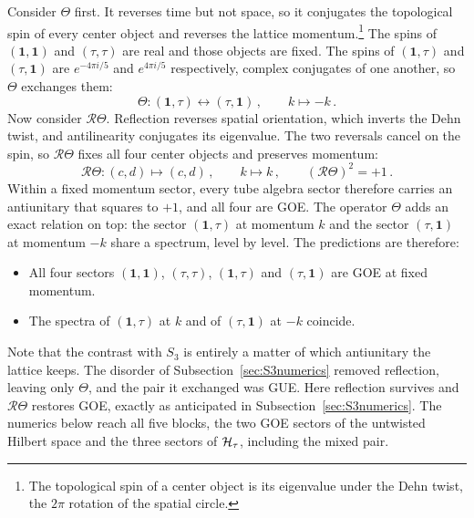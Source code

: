 \documentclass[11pt]{article}
\numberwithin{equation}{section}
\begin{document}
Consider $\Theta$ first. It reverses time but not space, so it conjugates the topological spin of every
center object and reverses the lattice momentum.\footnote{The topological spin of a center object
is its eigenvalue under the Dehn twist, the $2\pi$ rotation of the spatial circle.} The spins of $(\mathbf 1,\mathbf 1)$ and $(\tau,\tau)$ are real
and those objects are fixed. The spins of $(\mathbf 1,\tau)$ and $(\tau,\mathbf 1)$ are $e^{-4\pi i/5}$ and $e^{4\pi i/5}$ respectively,
complex conjugates of one another, so $\Theta$ exchanges them:
\begin{equation}
  \Theta : (\mathbf 1,\tau) \longleftrightarrow (\tau,\mathbf 1) \,, \qquad k \longmapsto -k \,.
  \label{eq:fibpair}
\end{equation}
Now consider $\mathcal{R}\Theta$. Reflection reverses spatial orientation, which inverts the Dehn twist, and
antilinearity conjugates its eigenvalue. The two reversals cancel on the spin, so $\mathcal{R}\Theta$ fixes all
four center objects and preserves momentum:
\begin{equation}
  \mathcal{R}\Theta : (c,d) \longmapsto (c,d) \,, \qquad k \longmapsto k \,, \qquad (\mathcal{R}\Theta)^2 = +1 \,.
  \label{eq:fibcrt}
\end{equation}
Within a fixed momentum sector, every tube algebra sector therefore carries an antiunitary that
squares to $+1$, and all four are GOE. The operator $\Theta$ adds an exact relation on top: the sector
$(\mathbf 1,\tau)$ at momentum $k$ and the sector $(\tau,\mathbf 1)$ at momentum $-k$ share a spectrum, level by
level. The predictions are therefore:
\begin{itemize}
  \item All four sectors $(\mathbf 1,\mathbf 1)$, $(\tau,\tau)$, $(\mathbf 1,\tau)$ and $(\tau,\mathbf 1)$ are GOE at fixed
        momentum.
  \item The spectra of $(\mathbf 1,\tau)$ at $k$ and of $(\tau,\mathbf 1)$ at $-k$ coincide.
\end{itemize}
Note that the contrast with $S_3$ is entirely a matter of which antiunitary the lattice keeps. The
disorder of Subsection~\ref{sec:S3numerics} removed reflection, leaving only $\Theta$, and the pair it
exchanged was GUE. Here reflection survives and $\mathcal{R}\Theta$ restores GOE, exactly as anticipated in
Subsection~\ref{sec:S3numerics}. The numerics below reach all five blocks, the two GOE sectors of the untwisted Hilbert space and
the three sectors of $\mathcal{H}_\tau$, including the mixed pair.
\end{document}
